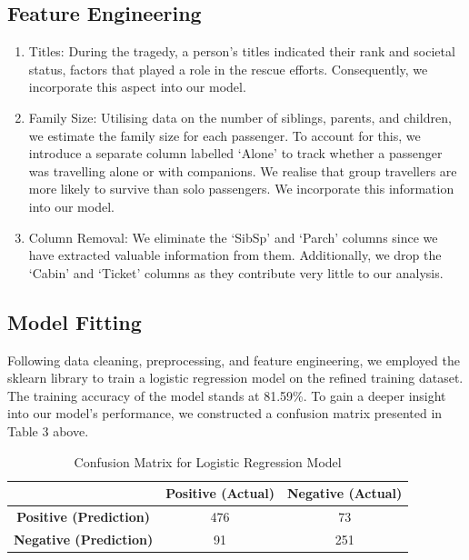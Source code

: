 \documentclass[conference]{IEEEtran}
\begin{document}
\subsection{Feature Engineering}
\begin{enumerate}
    \item Titles: During the tragedy, a person’s titles indicated their rank and societal status, factors that played a role in the rescue efforts. Consequently, we incorporate this aspect into our model.
    
    \item Family Size: Utilising data on the number of siblings, parents, and children, we estimate the family size for each passenger. To account for this, we introduce a separate column labelled ‘Alone’ to track whether a passenger was travelling alone or with companions. We realise that group travellers are more likely to survive than solo passengers. We incorporate this information into our model.
    
    \item Column Removal: We eliminate the ‘SibSp’ and ‘Parch’ columns since we have extracted valuable information from them. Additionally, we drop the ‘Cabin’ and ‘Ticket’ columns as they contribute very little to our analysis.
\end{enumerate}

\subsection{Model Fitting}
Following data cleaning, preprocessing, and feature engineering, we employed the sklearn library to train a logistic regression model on the refined training dataset. The training accuracy of the model stands at 81.59\%. To gain a deeper insight into our model’s performance, we constructed a confusion matrix presented in Table 3 above.

\begin{table}[h!]
  \centering
  \caption{Confusion Matrix for Logistic Regression Model}
  \label{tab:table}
  \begin{tabular}{|c|c|c|}
    \hline
    \textbf{} & \textbf{Positive (Actual)} & \textbf{Negative (Actual)} \\
    \hline
    \textbf{Positive (Prediction)} & 476 & 73 \\
    \hline
    \textbf{Negative (Prediction)} & 91 & 251 \\
    \hline
  \end{tabular}
\end{table}
\end{document}
